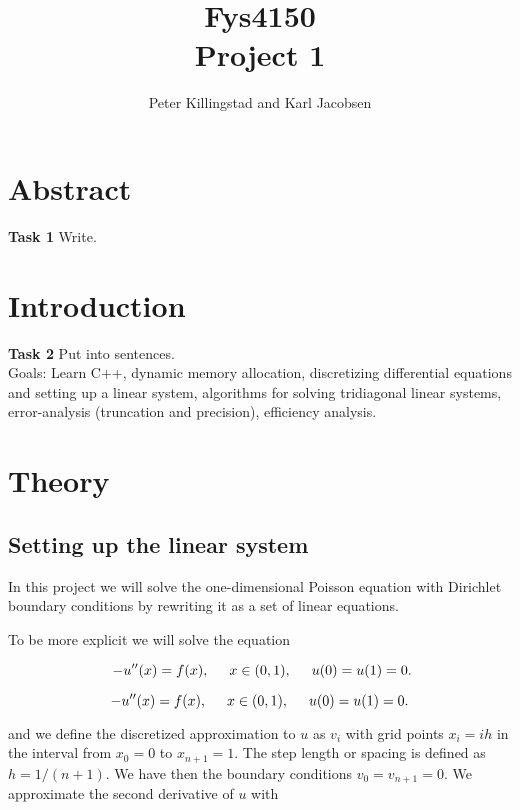 \documentclass{article}
\title{Fys4150\\Project 1\\ }
\author{Peter Killingstad and Karl Jacobsen}
\begin{document}
	
\maketitle

\tableofcontents

\pagebreak
\section{Abstract}
\textbf{Task 1} Write.
\section{Introduction}
\textbf{Task 2} Put into sentences.\\

Goals: Learn C++, dynamic memory allocation, discretizing differential equations and setting up a linear system, algorithms for solving tridiagonal linear systems, error-analysis (truncation and precision), efficiency analysis.

\section{Theory}


\subsection{Setting up the linear system}
In this project we will solve the one-dimensional Poisson equation
with Dirichlet boundary conditions by rewriting it as a set of linear equations.


To be more explicit we will solve the equation

\begin{equation}\
-u''(x) = f(x), \hspace{0.5cm} x\in(0,1), \hspace{0.5cm} u(0) = u(1) = 0.
\end{equation}

\begin{equation}
-u''(x) = f(x), \hspace{0.5cm} x\in(0,1), \hspace{0.5cm} u(0) = u(1) = 0.
\label{eqn:diffEquation}
\end{equation}

and we define the discretized approximation  to $u$ as $v_i$  with 
grid points $x_i=ih$   in the interval from $x_0=0$ to $x_{n+1}=1$.
The step length or spacing is defined as $h=1/(n+1)$. 
We have then the boundary conditions $v_0 = v_{n+1} = 0$.
We  approximate the second
derivative of $u$ with
\end{document}
